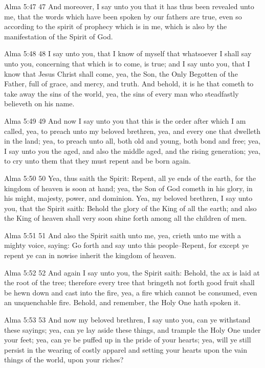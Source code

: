 Alma 5:47
 47 And moreover, I say unto you that it has thus been revealed
unto me, that the words which have been spoken by our fathers are
true, even so according to the spirit of prophecy which is in me,
which is also by the manifestation of the Spirit of God.

Alma 5:48
 48 I say unto you, that I know of myself that whatsoever I shall
say unto you, concerning that which is to come, is true; and I
say unto you, that I know that Jesus Christ shall come, yea, the
Son, the Only Begotten of the Father, full of grace, and mercy,
and truth. And behold, it is he that cometh to take away the
sins of the world, yea, the sins of every man who steadfastly
believeth on his name.

Alma 5:49
 49 And now I say unto you that this is the order after which I
am called, yea, to preach unto my beloved brethren, yea, and
every one that dwelleth in the land; yea, to preach unto all,
both old and young, both bond and free; yea, I say unto you the
aged, and also the middle aged, and the rising generation; yea,
to cry unto them that they must repent and be born again.

Alma 5:50
 50 Yea, thus saith the Spirit: Repent, all ye ends of the earth,
for the kingdom of heaven is soon at hand; yea, the Son of God
cometh in his glory, in his might, majesty, power, and dominion.
Yea, my beloved brethren, I say unto you, that the Spirit saith:
Behold the glory of the King of all the earth; and also the King
of heaven shall very soon shine forth among all the children of
men.

Alma 5:51
 51 And also the Spirit saith unto me, yea, crieth unto me with a
mighty voice, saying: Go forth and say unto this people--Repent,
for except ye repent ye can in nowise inherit the kingdom of
heaven.

Alma 5:52
 52 And again I say unto you, the Spirit saith: Behold, the ax is
laid at the root of the tree; therefore every tree that bringeth
not forth good fruit shall be hewn down and cast into the fire,
yea, a fire which cannot be consumed, even an unquenchable fire.
Behold, and remember, the Holy One hath spoken it.

Alma 5:53
 53 And now my beloved brethren, I say unto you, can ye withstand
these sayings; yea, can ye lay aside these things, and trample
the Holy One under your feet; yea, can ye be puffed up in the
pride of your hearts; yea, will ye still persist in the wearing
of costly apparel and setting your hearts upon the vain things of
the world, upon your riches?

